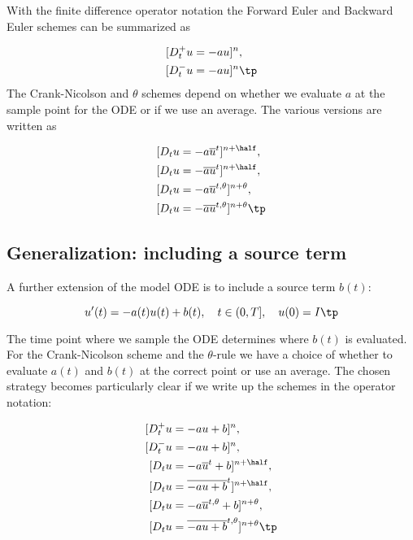 \documentclass[graybox,sectrefs,envcountresetchap,open=right,final]{svmonodo}
\begin{document}
With the finite difference operator notation the Forward Euler and Backward
Euler schemes can be summarized as

\begin{align}
\lbrack D^+_t u &= -au\rbrack^n,\\ 
\lbrack D^-_t u &= -au\rbrack^n
\tp
\end{align}
The Crank-Nicolson and $\theta$ schemes depend on whether we evaluate
$a$ at the sample point for the ODE or if we use an average. The
various versions are written as

\begin{align}
\lbrack D_t u &= -a\overline{u}^t\rbrack^{n+\half},\\ 
\lbrack D_t u &= -\overline{au}^t\rbrack^{n+\half},\\ 
\lbrack D_t u &= -a\overline{u}^{t,\theta}\rbrack^{n+\theta},\\ 
\lbrack D_t u &= -\overline{au}^{t,\theta}\rbrack^{n+\theta}
\tp
\end{align}


\subsection{Generalization: including a source term}
\label{decay:source}

A further extension of the model ODE is to include a source term $b(t)$:

\begin{equation}
u^{\prime}(t) = -a(t)u(t) + b(t),\quad t\in (0,T],\quad u(0)=I
\tp
\label{decay:problem:ab}
\end{equation}

The time point where we sample the ODE determines where $b(t)$ is
evaluated. For the Crank-Nicolson scheme and the $\theta$-rule we
have a choice of whether to evaluate $a(t)$ and $b(t)$ at the
correct point or use an average. The chosen strategy becomes
particularly clear if we write up the schemes in the operator notation:

\begin{align}
\lbrack D^+_t u &= -au + b\rbrack^n,\\ 
\lbrack D^-_t u &= -au + b\rbrack^n,\\ 
\lbrack D_t u   &= -a\overline{u}^t + b\rbrack^{n+\half},\\ 
\lbrack D_t u   &= \overline{-au+b}^t\rbrack^{n+\half},\\ 
\lbrack D_t u   &= -a\overline{u}^{t,\theta} + b\rbrack^{n+\theta},\\ 
\lbrack D_t u   &= \overline{-au+b}^{t,\theta}\rbrack^{n+\theta}
\label{decay:problem:ab:theta:avg:all:op}
\tp
\end{align}
\end{document}
